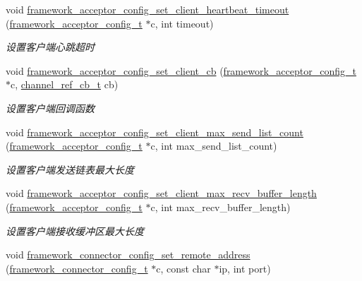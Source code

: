 \begin{DoxyCompactItemize}
void \hyperlink{a00104_gab810538b3fa23ae98027e451f52e4221_gab810538b3fa23ae98027e451f52e4221}{framework\+\_\+acceptor\+\_\+config\+\_\+set\+\_\+client\+\_\+heartbeat\+\_\+timeout} (\hyperlink{a00051_a61a4e424ff4c86631423dedd97c40064_a61a4e424ff4c86631423dedd97c40064}{framework\+\_\+acceptor\+\_\+config\+\_\+t} $\ast$c, int timeout)
\begin{DoxyCompactList}\small\item\em 设置客户端心跳超时 \end{DoxyCompactList}\item 
void \hyperlink{a00104_ga93ecf8240201cbc64b76857242fb39d6_ga93ecf8240201cbc64b76857242fb39d6}{framework\+\_\+acceptor\+\_\+config\+\_\+set\+\_\+client\+\_\+cb} (\hyperlink{a00051_a61a4e424ff4c86631423dedd97c40064_a61a4e424ff4c86631423dedd97c40064}{framework\+\_\+acceptor\+\_\+config\+\_\+t} $\ast$c, \hyperlink{a00051_ae296ec4d1ce108960de8dcc423956a1d_ae296ec4d1ce108960de8dcc423956a1d}{channel\+\_\+ref\+\_\+cb\+\_\+t} cb)
\begin{DoxyCompactList}\small\item\em 设置客户端回调函数 \end{DoxyCompactList}\item 
void \hyperlink{a00104_ga7c7289f2fdf2a2e220ceec22b5532909_ga7c7289f2fdf2a2e220ceec22b5532909}{framework\+\_\+acceptor\+\_\+config\+\_\+set\+\_\+client\+\_\+max\+\_\+send\+\_\+list\+\_\+count} (\hyperlink{a00051_a61a4e424ff4c86631423dedd97c40064_a61a4e424ff4c86631423dedd97c40064}{framework\+\_\+acceptor\+\_\+config\+\_\+t} $\ast$c, int max\+\_\+send\+\_\+list\+\_\+count)
\begin{DoxyCompactList}\small\item\em 设置客户端发送链表最大长度 \end{DoxyCompactList}\item 
void \hyperlink{a00104_ga7d46d7c6ac5a9871251b5efab34d767b_ga7d46d7c6ac5a9871251b5efab34d767b}{framework\+\_\+acceptor\+\_\+config\+\_\+set\+\_\+client\+\_\+max\+\_\+recv\+\_\+buffer\+\_\+length} (\hyperlink{a00051_a61a4e424ff4c86631423dedd97c40064_a61a4e424ff4c86631423dedd97c40064}{framework\+\_\+acceptor\+\_\+config\+\_\+t} $\ast$c, int max\+\_\+recv\+\_\+buffer\+\_\+length)
\begin{DoxyCompactList}\small\item\em 设置客户端接收缓冲区最大长度 \end{DoxyCompactList}\item 
void \hyperlink{a00104_ga3d5c40af2faafd53f9ead5cb2ff8c0b0_ga3d5c40af2faafd53f9ead5cb2ff8c0b0}{framework\+\_\+connector\+\_\+config\+\_\+set\+\_\+remote\+\_\+address} (\hyperlink{a00051_a81253f4c995b97e69be0e67f7a26097f_a81253f4c995b97e69be0e67f7a26097f}{framework\+\_\+connector\+\_\+config\+\_\+t} $\ast$c, const char $\ast$ip, int port)

\end{DoxyCompactItemize}

